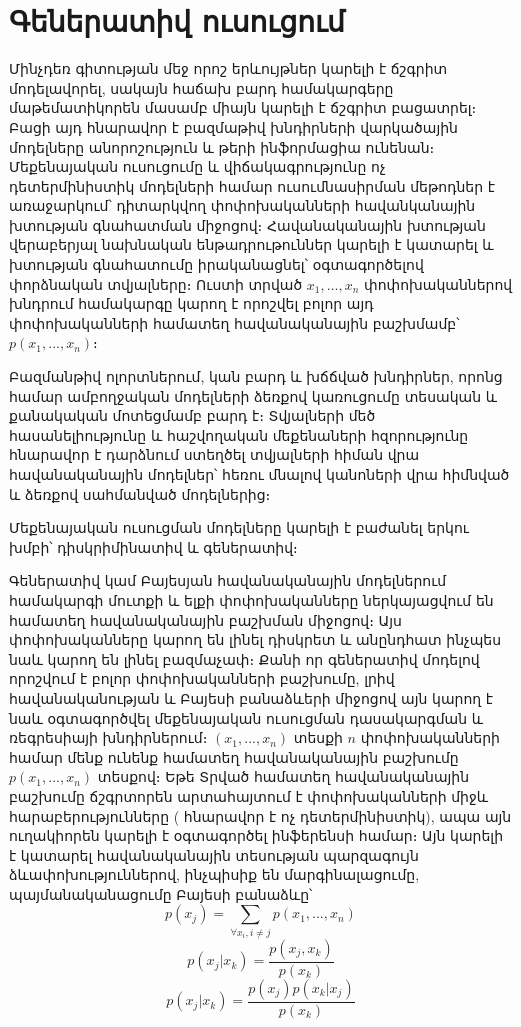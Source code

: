 \documentclass[11pt]{article}
\begin{document}
\iffalse
\section*{\hfill Գեներատիվ ուսուցում \hfill} \noindent

{}


\par Մինչդեռ գիտության մեջ որոշ երևույթներ կարելի է ճշգրիտ մոդելավորել, սակայն հաճախ բարդ համակարգերը մաթեմատիկորեն մասամբ միայն կարելի է ճշգրիտ բացատրել։ Բացի այդ հնարավոր է բազմաթիվ խնդիրների վարկածային մոդելները անորոշություն և թերի ինֆորմացիա ունենան։ Մեքենայական ուսուցումը և վիճակագրությունը ոչ դետերմինիստիկ մոդելների համար ուսումնասիրման մեթոդներ է առաջարկում՝  դիտարկվող փոփոխականների հավանկանային խտության գնահատման միջոցով։ Հավանականային խտության վերաբերյալ նախնական ենթադրութուններ կարելի է կատարել և խտության գնահատումը իրականացնել՝ օգտագործելով փորձնական տվյալները։ Ուստի տրված $x_1, ..., x_n$ փոփոխականներով խնդրում համակարգը կարող է որոշվել բոլոր այդ փոփոխականների համատեղ հավանականային բաշխմամբ՝ $p  \left ( x_1, ..., x_n \right )$։
\par Բազմանթիվ ոլորտներում, կան բարդ և խճճված խնդիրներ, որոնց համար ամբողջական մոդելների ձեռքով կառուցումը  տեսական և քանակական մոտեցմամբ  բարդ է։ Տվյալների մեծ հասանելիությունը և հաշվողական մեքենաների հզորությունը հնարավոր է դարձնում ստեղծել տվյալների հիման վրա հավանականային մոդելներ՝ հեռու մնալով կանոների վրա հիմնված և ձեռքով սահմանված մոդելներից։ 

\par
Մեքենայական ուսուցման մոդելները կարելի է բաժանել երկու խմբի՝ դիսկրիմինատիվ և գեներատիվ։


Գեներատիվ կամ Բայեսյան հավանականային մոդելներում համակարգի մուտքի և ելքի փոփոխականները ներկայացվում են համատեղ հավանականային բաշխման միջոցով։ Այս փոփոխականները կարող են լինել դիսկրետ և անընդհատ ինչպես նաև կարող են լինել բազմաչափ։ Քանի որ գեներատիվ մոդելով որոշվում է բոլոր փոփոխականների բաշխումը, լրիվ  հավանականության և Բայեսի բանաձևերի միջոցով   այն կարող է նաև օգտագործվել մեքենայական ուսուցման դասակարգման և ռեգրեսիայի խնդիրներում։ $(x_1, ..., x_n)$ տեսքի $n$ փոփոխականների համար մենք ունենք համատեղ հավանականային բաշխումը $p(x_1, ..., x_n)$ տեսքով։ Եթե Տրված համատեղ հավանականային բաշխումը ճշգրտորեն արտահայտում է փոփոխականների միջև հարաբերությունները ( հնարավոր է ոչ դետերմինիստիկ), ապա այն ուղակիորեն կարելի է օգտագործել ինֆերենսի համար։  Այն կարելի է կատարել հավանականային տեսության պարզագույն ձևափոխություններով, ինչպիսիք են մարգինալացումը, պայմանականացումը Բայեսի բանաձևը՝
$$p(x_j) = \sum_{\forall x_i, i \neq j}{p(x_1, ..., x_n)}$$
$$p(x_j | x_k) = \frac {p(x_j, x_k)} {p(x_k)}$$
$$p(x_j | x_k) = \frac {p(x_j)p(x_k |x_j)} {p(x_k)}$$
\end{document}
